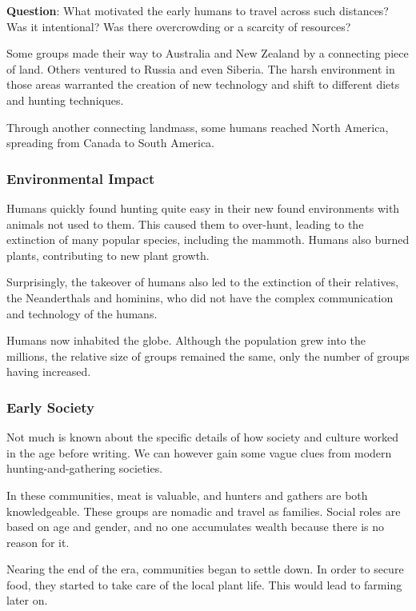 \documentclass[11pt]{article}
\begin{document}
\textbf{Question}: What motivated the early humans to travel across such distances? Was it intentional? Was there overcrowding or a scarcity of resources?

Some groups made their way to Australia and New Zealand by a connecting piece of land. Others ventured to Russia and even Siberia. The harsh environment in those areas warranted the creation of new technology and shift to different diets and hunting techniques.

Through another connecting landmass, some humans reached North America, spreading from Canada to South America.

\subsubsection{Environmental Impact}
\label{sec:org98a484a}

Humans quickly found hunting quite easy in their new found environments with animals not used to them. This caused them to over-hunt, leading to the extinction of many popular species, including the mammoth. Humans also burned plants, contributing to new plant growth.

Surprisingly, the takeover of humans also led to the extinction of their relatives, the Neanderthals and hominins, who did not have the complex communication and technology of the humans.

Humans now inhabited the globe. Although the population grew into the millions, the relative size of groups remained the same, only the number of groups having increased.

\subsubsection{Early Society}
\label{sec:org5f09215}

Not much is known about the specific details of how society and culture worked in the age before writing. We can however gain some vague clues from modern hunting-and-gathering societies.

In these communities, meat is valuable, and hunters and gathers are both knowledgeable. These groups are nomadic and travel as families. Social roles are based on age and gender, and no one accumulates wealth because there is no reason for it.

Nearing the end of the era, communities began to settle down. In order to secure food, they started to take care of the local plant life. This would lead to farming later on.
\end{document}
